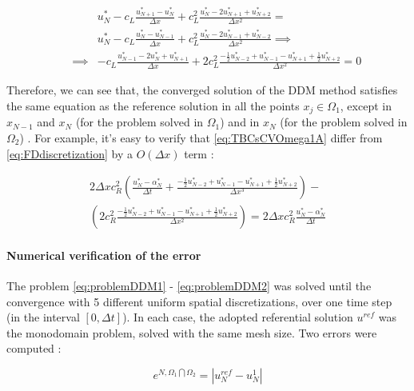 \begin{equation}
    \label{eq:TBCsCVOmega2}
\begin{aligned}
   && 					&	 u_N^* -  c_L\frac{u_{N+1}^* - u_{N}^*}{\Delta x} + c_L^2 \frac{u_{N}^* - 2u_{N+1}^* + u_{N+2}^*}{\Delta x^2} = \\ 
   && 					& u_N^* -  c_L\frac{u_{N}^* - u_{N-1}^*}{\Delta x} + c_L^2 \frac{u_{N}^* - 2u_{N-1}^* + u_{N-2}^*}{\Delta x^2} \implies \\
	&&  \implies	    & -c_L\frac{u_{N-1}^* - 2 u_{N}^* + u_{N+1}^*}{\Delta x} + 2c_L^2\frac{-\frac{1}{2}u_{N-2}^* + u_{N-1}^* - u_{N+1}^* + \frac{1}{2}u_{N+2}^* }{\Delta x^2} = 0 
\end{aligned}
\end{equation}

\indent Therefore, we can see that, the converged solution of the DDM method satisfies the same equation as the reference solution in all the points $x_j \in \Omega_1$, except in $x_{N-1}$ and $x_N$ (for the problem solved in $\Omega_1$) and in $x_N$ (for the problem solved in $\Omega_2$) . For example, it's easy to verify that \eqref{eq:TBCsCVOmega1A} differ from \eqref{eq:FDdiscretization} by a $O(\Delta x)$ term :

\begin{equation}
    \label{eq:diffEquations}
    \begin{aligned}
    2\Delta x c_R^2\left( \frac{u_N^* - \alpha_N^*}{\Delta t} + \frac{-\frac{1}{2}u_{N-2}^* + u_{N-1}^* - u_{N+1}^* + \frac{1}{2}u_{N+2}^* }{\Delta x ^3} \right) - \\
    \left( 2c_R^2 \frac{-\frac{1}{2}u_{N-2}^* + u_{N-1}^* - u_{N+1}^* + \frac{1}{2}u_{N+2}^* }{\Delta x^2} \right) =  2\Delta x c_R^2 \frac{u_N^* - \alpha_N^*}{\Delta t}
    \end{aligned}
\end{equation}

\paragraph{Numerical verification of the error}

\indent The problem \eqref{eq:problemDDM1} - \eqref{eq:problemDDM2} was solved until the convergence with 5 different uniform spatial discretizations, over one time step (in the interval $[0,\Delta t]$). In each case, the adopted referential solution $u^{ref}$ was the monodomain problem, solved with the same mesh size. Two errors were computed : 

\begin{equation}
	e^{N,\Omega_1\bigcap \Omega_2} = |u^{ref}_N - u^{1}_N|
\end{equation}

